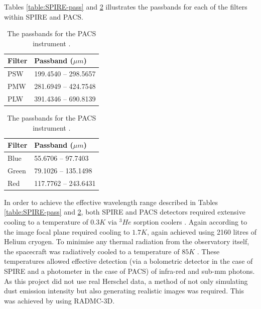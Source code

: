 \documentclass{report}
\begin{document}
Tables \ref{table:SPIRE-pass} and \ref{table:PACS-pass} illustrates the passbands for each of the filters within SPIRE and PACS.

\begin{table}[h]
  \captionsetup{width=0.3\textwidth}
  \parbox{.4\linewidth}{
  \centering
  \begin{tabular}{||l l||}
  \hline
  Filter & Passband ($\mu m$) \\ [0.5ex]
  \hline\hline
  PSW    &    199.4540 --	298.5657   \\
  \hline
  PMW    &    281.6949 --	424.7548   \\
  \hline
  PLW    &    391.4346 --	690.8139   \\ [1ex]
  \hline
  \end{tabular}
  \caption{\protect The passbands (for extended source) for the SPIRE instrument \parencite{pass}.}
  \label{table:SPIRE-pass}
  }
  \parbox{.4\linewidth}{
  \centering
  \begin{tabular}{||l l||}
  \hline
  Filter & Passband ($\mu m$) \\ [0.5ex]
  \hline\hline
  Blue   &    55.6706 -- 97.7403       \\
  \hline
  Green  &    79.1026 --	135.1498     \\
  \hline
  Red    &    117.7762 --	243.6431     \\ [1ex]
  \hline
  \end{tabular}
  \caption{\protect The passbands for the PACS instrument \parencite{pass}.}
  \label{table:PACS-pass}
  }
\end{table}

In order to achieve the effective wavelength range described in Tables \ref{table:SPIRE-pass} and \ref{table:PACS-pass}, both SPIRE and PACS detectors required extensive cooling to a temperature of $0.3 K$ via $^{3}{He}$ sorption coolers \parencite{herschel}. Again according to \textcite{herschel} the image focal plane required cooling to $1.7 K$, again achieved using 2160 litres of Helium cryogen. To minimise any thermal radiation from the observatory itself, the spacecraft was radiatively cooled to a temperature of $85 K$ \parencite{herschel}. These temperatures allowed effective detection (via a bolometric detector in the case of SPIRE and a photometer in the case of PACS) of infra-red and sub-mm photons. As this project did not use real Herschel data, a method of not only simulating dust emission intensity but also generating realistic images was required. This was achieved by using RADMC-3D.
\end{document}
